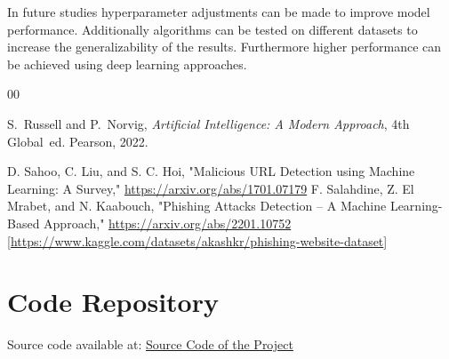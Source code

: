 \documentclass[conference]{IEEEtran}
\begin{document}
In future studies hyperparameter adjustments can be made to improve model performance.  Additionally algorithms can be tested on different datasets to increase the generalizability of the results.  Furthermore higher performance can be achieved using deep learning approaches.



	\begin{thebibliography}{00}
		
		 S.~Russell and P.~Norvig, \textit{Artificial Intelligence: A Modern Approach}, 4th Global~ed. Pearson, 2022.
		
            D. Sahoo, C. Liu, and S. C. Hoi,
            "Malicious URL Detection using Machine Learning: A Survey,"
            \url{https://arxiv.org/abs/1701.07179}
            F. Salahdine, Z. El Mrabet, and N. Kaabouch,
            "Phishing Attacks Detection -- A Machine Learning-Based Approach,"
            \url{https://arxiv.org/abs/2201.10752}
         [\href{https://www.kaggle.com/datasets/akashkr/phishing-website-dataset}{https://www.kaggle.com/datasets/akashkr/phishing-website-dataset}]
	\end{thebibliography}
	
	\appendix
	\section{Code Repository}
	\label{app:code}
	
	Source code available at: \href{https://github.com/1TahaBey1/phishing-ml-project.git}{Source Code of the Project}
	
	
\end{document}
